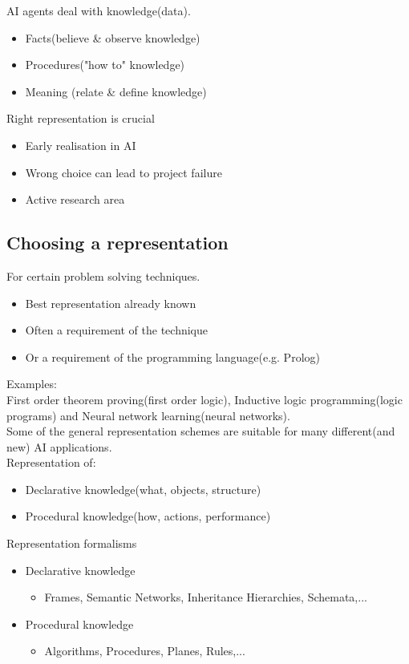 AI agents deal with knowledge(data).
\begin{itemize}
\item Facts(believe \& observe knowledge)
\item Procedures("how to" knowledge)
\item Meaning (relate \& define knowledge)
\end{itemize}

Right representation is crucial 
\begin{itemize}
\item Early realisation in AI
\item Wrong choice can lead to project failure
\item Active research area
\end{itemize}

\subsection{Choosing a representation}
For certain problem solving techniques.
\begin{itemize}
\item Best representation already known
\item Often a requirement of the technique
\item Or a requirement of the programming language(e.g. Prolog)
\end{itemize}

Examples:\\
First order theorem proving(first order logic), Inductive logic programming(logic programs) and Neural network learning(neural networks). \\

Some of the general representation schemes are suitable for many different(and new) AI applications. \\

Representation of:
\begin{itemize}
\item Declarative knowledge(what, objects, structure)
\item Procedural knowledge(how, actions, performance)
\end{itemize}

Representation formalisms
\begin{itemize}
\item Declarative knowledge
\begin{itemize}
\item Frames, Semantic Networks, Inheritance Hierarchies, Schemata,...
\end{itemize}
\item Procedural knowledge
\begin{itemize}
\item Algorithms, Procedures, Planes, Rules,...
\end{itemize}
\end{itemize}

